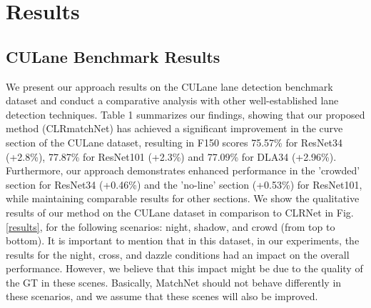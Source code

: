 \documentclass[10pt,twocolumn,letterpaper]{article}
\begin{document}
\section{Results}
\subsection{CULane Benchmark Results}
We present our approach results on the CULane lane detection benchmark dataset and conduct a comparative analysis with other well-established lane detection techniques. Table 1 summarizes our findings, showing that our proposed method (CLRmatchNet) has achieved a significant improvement in the curve section of the CULane dataset, resulting in F150 scores 75.57\% for ResNet34 (+2.8\%), 77.87\% for ResNet101 (+2.3\%) and 77.09\% for DLA34 (+2.96\%). Furthermore, our approach demonstrates enhanced performance in the 'crowded' section for ResNet34 (+0.46\%) and the 'no-line' section (+0.53\%) for ResNet101, while maintaining comparable results for other sections. We show the qualitative results of our method on the CULane dataset in comparison to CLRNet in Fig.\ref{results}, for the following scenarios: night, shadow, and crowd (from top to bottom). It is important to mention that in this dataset, in our experiments, the results for the night, cross, and dazzle conditions had an impact on the overall performance. However, we believe that this impact might be due to the quality of the GT in these scenes. Basically, MatchNet should not behave differently in these scenarios, and we assume that these scenes will also be improved. 
\end{document}

